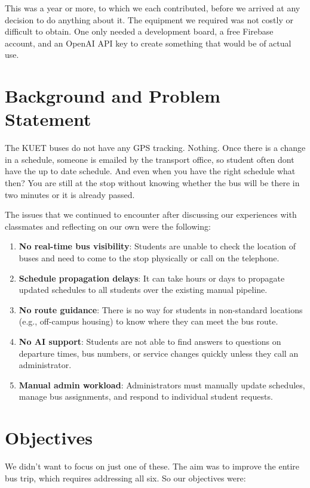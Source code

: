 \documentclass[12pt,a4paper]{report}
\begin{document}
This was a year or more, to which we each contributed, before we arrived at any decision to do anything about it. The equipment we required was not costly or difficult to obtain. One only needed a development board, a free Firebase account, and an OpenAI API key to create something that would be of actual use.

\section{Background and Problem Statement}

The KUET buses do not have any GPS tracking. Nothing. Once there is a change in a schedule, someone is emailed by the transport office, so student often dont have the up to date schedule. And even when you have the right schedule what then? You are still at the stop without knowing whether the bus will be there in two minutes or it is already passed.

The issues that we continued to encounter after discussing our experiences with classmates and reflecting on our own were the following:

\begin{enumerate}[leftmargin=*, label=\arabic*.]
  \item \textbf{No real-time bus visibility}: Students are unable to check the location of buses and need to come to the stop physically or call on the telephone.
  \item \textbf{Schedule propagation delays}: It can take hours or days to propagate updated schedules to all students over the existing manual pipeline.
  \item \textbf{No route guidance}: There is no way for students in non-standard locations (e.g., off-campus housing) to know where they can meet the bus route.
  \item \textbf{No AI support}: Students are not able to find answers to questions on departure times, bus numbers, or service changes quickly unless they call an administrator.
  \item \textbf{Manual admin workload}: Administrators must manually update schedules, manage bus assignments, and respond to individual student requests.
\end{enumerate}

\section{Objectives}

We didn't want to focus on just one of these. The aim was to improve the entire bus trip, which requires addressing all six. So our objectives were:
\end{document}
